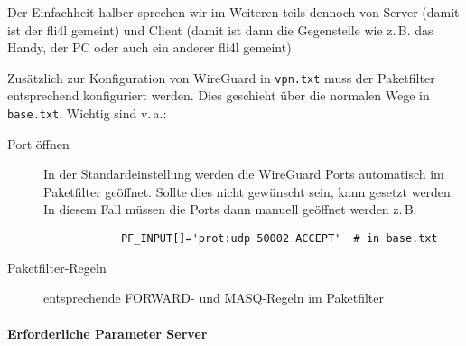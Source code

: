 Der Einfachheit halber sprechen wir im Weiteren teils dennoch von Server (damit
ist der fli4l gemeint) und Client (damit ist dann die Gegenstelle wie z.\,B. das Handy,
der PC oder auch ein anderer fli4l gemeint)

 Zusätzlich zur Konfiguration von WireGuard in
\texttt{vpn.txt} muss der Paketfilter entsprechend konfiguriert
werden. Dies geschieht über die normalen Wege in \texttt{base.txt}.
Wichtig sind v.\,a.:

\begin{description}
    \item[Port öffnen] In der Standardeinstellung werden die WireGuard Ports automatisch
    im Paketfilter geöffnet. Sollte dies nicht gewünscht sein, kann
     gesetzt werden.
    In diesem Fall müssen die Ports dann manuell geöffnet werden z.\,B.
        \begin{example}
        \begin{verbatim}
            PF_INPUT[]='prot:udp 50002 ACCEPT'  # in base.txt
        \end{verbatim}
        \end{example}
    \item[Paketfilter-Regeln] entsprechende FORWARD- und MASQ-Regeln im Paketfilter
\end{description}


\paragraph{Erforderliche Parameter Server}

